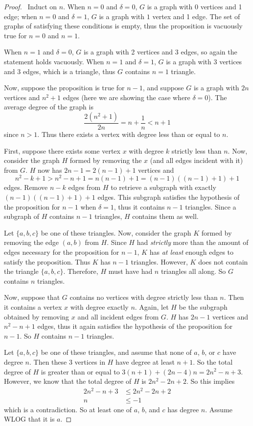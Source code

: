 \documentclass[12pt]{article}
\begin{document}
\begin{enumerate}[leftmargin=0cm,itemindent=.5cm,labelwidth=\itemindent,labelsep=0cm,align=left]
\begin{proof}
\ Induct on $n$.  When $n=0$ and $\delta = 0$, $G$ is a graph with $0$ vertices and 1 edge; when $n = 0$ and $\delta = 1$, $G$ is a graph with $1$ vertex and 1 edge.  The set of graphs of satisfying these conditions is empty, thus the proposition is vacuously true for $n = 0$ and $n = 1$.

When $n = 1$ and $\delta = 0$, $G$ is a graph with 2 vertices and 3 edges, so again the statement holds vacuously.  When $n = 1$ and $\delta = 1$, $G$ is a graph with 3 vertices and 3 edges, which is a triangle, thus $G$ contains $n=1$ triangle.

Now, suppose the proposition is true for $n-1$, and suppose $G$ is a graph with $2n$ vertices and $n^2 + 1$ edges (here we are showing the case where $\delta = 0$).  The average degree of the graph is
$$
\frac{2(n^2 + 1)}{2n} = n + \frac1n < n+1
$$
since $n > 1$.  Thus there exists a vertex with degree less than or equal to $n$.

First, suppose there exists some vertex $x$ with degree $k$ strictly less than $n$.  Now, consider the graph $H$ formed by removing the $x$ (and all edges incident with it) from $G$.  $H$ now has $2n-1 = 2(n-1) + 1$ vertices and $$n^2 - k + 1 > n^2 - n + 1 = n(n-1) + 1 = (n-1)((n-1) + 1) + 1$$ edges.  Remove $n-k$ edges from $H$ to retrieve a subgraph with exactly $(n-1)((n-1) + 1) + 1$ edges.  This subgraph satisfies the hypothesis of the proposition for $n-1$ when $\delta = 1$, thus it contains $n-1$ triangles.  Since a subgraph of $H$ contains $n-1$ triangles, $H$ contains them as well.

Let $\{a,b,c\}$ be one of these triangles.  Now, consider the graph $K$ formed by removing the edge $(a,b)$ from $H$.  Since $H$ had \emph{strictly} more than the amount of edges necessary for the proposition for $n-1$, $K$ has \emph{at least} enough edges to satisfy the proposition.  Thus $K$ has $n-1$ triangles.  However, $K$ does not contain the triangle $\{a,b,c\}$.  Therefore, $H$ must have had $n$ triangles all along.  So $G$ contains $n$ triangles.

Now, suppose that $G$ contains no vertices with degree strictly less than $n$.  Then it contains a vertex $x$ with degree exactly $n$.  Again, let $H$ be the subgraph obtained by removing $x$ and all incident edges from $G$.  $H$ has $2n-1$ vertices and $n^2 - n +1$ edges, thus it again satisfies the hypothesis of the proposition for $n-1$.  So $H$ contains $n-1$ triangles.

Let $\{a,b,c\}$ be one of these triangles, and assume that none of $a$, $b$, or $c$ have degree $n$.  Then these 3 vertices in $H$ have degree at least $n+1$.  So the total degree of $H$ is greater than or equal to $3(n+1) + (2n-4)n = 2n^2 - n + 3$.  However, we know that the total degree of $H$ is $2n^2 -2n + 2$.  So this implies
\begin{align*}
2n^2 - n + 3 &\leq 2n^2 - 2n + 2 \\
n &\leq -1
\end{align*}
which is a contradiction.  So at least one of $a$, $b$, and $c$ has degree $n$.  Assume WLOG that it is $a$.


\end{proof}
\end{enumerate}
\end{document}
